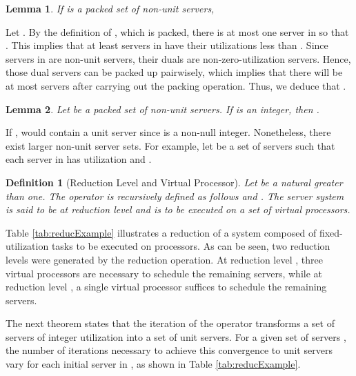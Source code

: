 \documentclass[twocolumn, compsocconf]{IEEEtran}
\newtheorem{lemma}{Lemma}[section]
\newtheorem{definition}{Definition}[section]
\newcounter{proc}
\begin{document}
\begin{lemma}\label{lem:reducConv}
  If  is a packed set of non-unit servers,
  
\end{lemma}

\begin{IEEEproof}
  Let . By the definition of , which is packed, there
  is at most one server  in  so that . This implies that at least  servers in  have their
  utilizations less than . Since servers in  are non-unit
  servers, their duals are non-zero-utilization servers. Hence, those dual
  servers can be packed up pairwisely, which implies that there will be at most
   servers after carrying out the packing operation.
  Thus, we deduce that .
\end{IEEEproof}

\begin{lemma}\label{lem:threeSetInteger}
  Let  be a packed set of non-unit servers. If  is
  an integer, then .
\end{lemma}


\begin{IEEEproof}
  If ,  would contain a unit server since
   is a non-null integer.  Nonetheless, there exist
  larger non-unit server sets. For example, let  be a set of
  servers such that each server in  has utilization
   and .
\end{IEEEproof}




\begin{definition}[Reduction Level and Virtual Processor]\label{dfn:virtalProc}
  Let  be a natural greater than one. The operator  is
  recursively defined as follows  and
  . The server
  system  is said to be at reduction level  and is to be
  executed on a set of virtual processors.
\end{definition}

Table \ref{tab:reducExample} illustrates a reduction of a system composed of
 fixed-utilization tasks to be executed on  processors. As can be
seen, two reduction levels were generated by the reduction operation. At
reduction level , three virtual processors are necessary to schedule the 
remaining servers, while at reduction level , a single virtual processor
suffices to schedule the  remaining servers.

The next theorem states that the iteration of the operator  transforms a
set of servers of integer utilization into a set of unit servers. For a given
set of servers , the number of iterations necessary to achieve this
convergence to unit servers vary for each initial server in , as shown
in Table \ref{tab:reducExample}.
\end{document}
